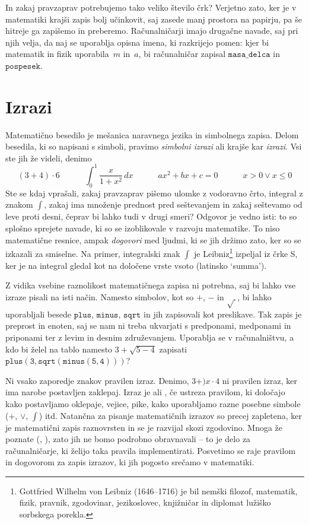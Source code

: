 In zakaj pravzaprav potrebujemo tako veliko število črk? Verjetno zato, ker je v
matematiki krajši zapis bolj učinkovit, saj zasede manj prostora na papirju, pa še hitreje
ga zapišemo in preberemo. Računalničarji imajo drugačne navade, saj pri njih velja, da naj
se uporablja opisna imena, ki razkrijejo pomen: kjer bi matematik in fizik uporabila~$m$
in~$a$, bi računalničar zapisal $\mathtt{masa\_delca}$ in $\mathtt{pospesek}$.

\section{Izrazi}
\label{sec:irazi}

Matematično besedilo je mešanica naravnega jezika in simbolnega zapisa. Delom besedila, ki
so napisani s simboli, pravimo \emph{simbolni izrazi} ali krajše kar \emph{izrazi}. Vsi
ste jih že videli, denimo
%
\begin{equation*}
  (3 + 4) \cdot 6 \qquad\quad
  \int_0^1 \frac{x}{1 + x^2} \, dx \qquad\quad
  a x^2 + b x + c = 0 \qquad\quad
  x > 0 \lor x \leq 0
\end{equation*}
%
Ste se kdaj vprašali, zakaj pravzaprav pišemo ulomke z vodoravno črto, integral z znakom
$\int$, zakaj ima množenje prednost pred seštevanjem in zakaj seštevamo od leve proti
desni, čeprav bi lahko tudi v drugi smeri? Odgovor je vedno isti: to so splošno sprejete
navade, ki so se izoblikovale v razvoju matematike. To niso matematične resnice, ampak
\emph{dogovori} med ljudmi, ki se jih držimo zato, ker so se izkazali za smiselne. Na
primer, integralski znak $\int$ je Leibniz\footnote{Gottfried Wilhelm von Leibniz
  (1646--1716) je bil nemški filozof, matematik, fizik, pravnik, zgodovinar, jezikoslovec,
  knjižničar in diplomat lužiško sorbskega porekla.} izpeljal iz črke S, ker je na
integral gledal kot na določene vrste vsoto (latinsko `summa').

Z vidika vsebine raznolikost matematičnega zapisa ni potrebna, saj bi lahko vse izraze
pisali na isti način. Namesto simbolov, kot so $+$, $-$ in $\sqrt{\ }$, bi lahko
uporabljali besede $\mathtt{plus}$, $\mathtt{minus}$, $\mathtt{sqrt}$ in jih zapisovali
kot preslikave. Tak zapis je preprost in enoten, saj se nam ni treba ukvarjati s
predponami, medponami in priponami ter z levim in desnim združevanjem. Uporablja se v
računalništvu, a kdo bi želel na tablo namesto $3 + \sqrt{5 - 4}$ zapisati
$\mathtt{plus(3, \mathtt{sqrt}(\mathtt{minus}(5, 4)))}$?

Ni vsako zaporedje znakov pravilen izraz. Denimo, $3 + ) x \cdot 4$ ni pravilen izraz, ker ima narobe postavljen zaklepaj.
%
Izraz je  ali , če ustreza pravilom, ki določajo kako postavljamo oklepaje, vejice, pike, kako uporabljamo razne posebne simbole ($+$, $\lor$, $\int$) itd.
%
Natančna  za pisanje matematičnih izrazov so precej zapletena, ker je matematični zapis raznovrsten
in se je razvijal skozi zgodovino. Mnoga že poznate (, ), zato jih ne bomo podrobno obravnavali -- to je delo za računalničarje, ki želijo taka pravila implementirati. Posvetimo se raje pravilom in dogovorom za zapis izrazov, ki jih pogosto srečamo v matematiki.


